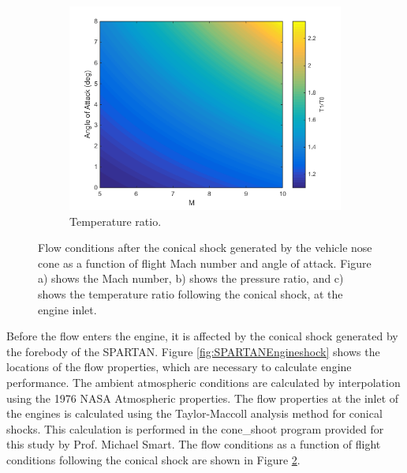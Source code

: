 \begin{figure}[ht]
\begin{subfigure}{.5\textwidth}
		\includegraphics[width=0.99\linewidth]{figures/3_vehicle_design/ConicalT}
		\caption{Temperature ratio.}
		\label{fig:ConicalT}
	\end{subfigure}
	\caption{Flow conditions after the conical shock generated by the vehicle nose cone as a function of flight Mach number and angle of attack. Figure a) shows the Mach number, b) shows the pressure ratio, and c) shows the temperature ratio following the conical shock, at the engine inlet.}
	\label{fig:ConicalShock}
\end{figure}
Before the flow enters the engine, it is affected by the conical shock generated by the forebody of the SPARTAN.
Figure \ref{fig:SPARTANEngineshock} shows the locations of the flow properties, which are necessary to calculate engine performance. The ambient atmospheric conditions are calculated by interpolation using the 1976 NASA Atmospheric properties\cite{Administration1976}.
The flow properties at the inlet of the engines is calculated using the Taylor-Maccoll analysis method for conical shocks\cite{TaylorMaccoll}. This calculation is performed in the \textsf{cone\_shoot} program provided for this study by Prof. Michael Smart. The flow conditions as a function of flight conditions following the conical shock are shown in Figure \ref{fig:ConicalShock}.  





